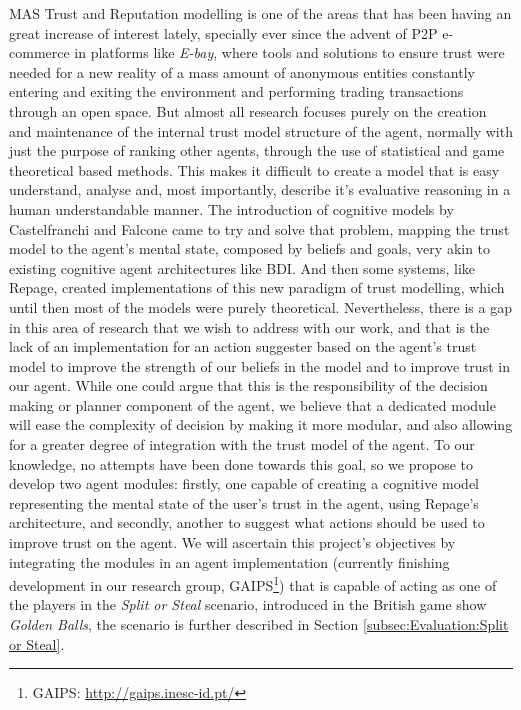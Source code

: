 \ac{MAS} Trust and Reputation modelling is one of the areas that has been having an great increase of interest lately, specially ever since the advent of \ac{P2P} e-commerce in platforms like \textit{E-bay}\cite{eBay2002}, where tools and solutions to ensure trust were needed for a new reality of a mass amount of anonymous entities constantly entering and exiting the environment and performing trading transactions through an open space. But almost all research focuses purely on the creation and maintenance of the internal trust model structure of the agent, normally with just the purpose of ranking other agents, through the use of statistical and game theoretical based methods. This makes it difficult to create a model that is easy understand, analyse and, most importantly, describe it's evaluative reasoning in a human understandable manner. The introduction of cognitive models by Castelfranchi and Falcone \cite{Castelfranchi1998} came to try and solve that problem, mapping the trust model to the agent's mental state, composed by beliefs and goals, very akin to existing cognitive agent architectures like BDI\cite{Rao1995}. And then some systems, like Repage\cite{Sabater2006}, created implementations of this new paradigm of trust modelling, which until then most of the models were purely theoretical. Nevertheless, there is a gap in this area of research that we wish to address with our work, and that is the lack of an implementation for an action suggester based on the agent's trust model to improve the strength of our beliefs in the model and to improve trust in our agent. While one could argue that this is the responsibility of the decision making or planner component of the agent, we believe that a dedicated module will ease the complexity of decision by making it more modular, and also allowing for a greater degree of integration with the trust model of the agent. To our knowledge, no attempts have been done towards this goal, so we propose to develop two agent modules: firstly, one capable of creating a cognitive model representing the mental state of the user's trust in the agent, using Repage's architecture, and secondly, another to suggest what actions should be used to improve trust on the agent. We will ascertain this project's objectives by integrating the modules in an agent implementation (currently finishing development in our research group, \acs{GAIPS}\footnote{\ac{GAIPS}: \url{http://gaips.inesc-id.pt/}}) that is capable of acting as one of the players in the \textit{Split or Steal} scenario, introduced in the British game show \textit{Golden Balls}\cite{Wikipedia.Golden.Balls}, the scenario is further described in Section \ref{subsec:Evaluation:Split or Steal}. 

